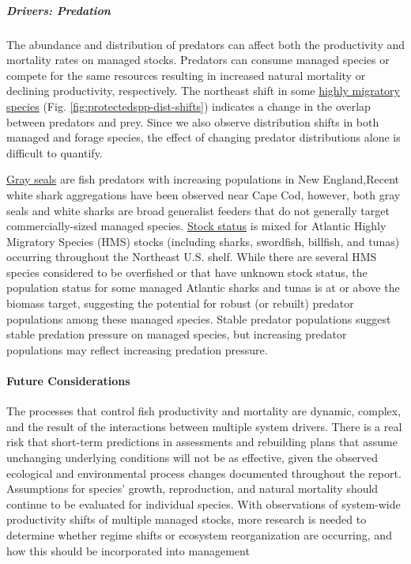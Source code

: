 \documentclass[
  10pt,
]{article}
\begin{document}
\subparagraph{Drivers: Predation}\label{drivers-predation}

The abundance and distribution of predators can affect both the productivity and mortality rates on managed stocks. Predators can consume managed species or compete for the same resources resulting in increased natural mortality or declining productivity, respectively. The northeast shift in some \href{https://noaa-edab.github.io/catalog/cetacean_dist.html}{highly migratory species} (Fig. \ref{fig:protectedspp-dist-shifts}) indicates a change in the overlap between predators and prey. Since we also observe distribution shifts in both managed and forage species, the effect of changing predator distributions alone is difficult to quantify.

\href{https://noaa-edab.github.io/catalog/grayseal.html}{Gray seals} are fish predators with increasing populations in New England,Recent white shark aggregations have been observed near Cape Cod, however, both gray seals and white sharks are broad generalist feeders that do not generally target commercially-sized managed species. \href{https://noaa-edab.github.io/catalog/hms_stock_status.html}{Stock status} is mixed for Atlantic Highly Migratory Species (HMS) stocks (including sharks, swordfish, billfish, and tunas) occurring throughout the Northeast U.S. shelf. While there are several HMS species considered to be overfished or that have unknown stock status, the population status for some managed Atlantic sharks and tunas is at or above the biomass target, suggesting the potential for robust (or rebuilt) predator populations among these managed species. Stable predator populations suggest stable predation pressure on managed species, but increasing predator populations may reflect increasing predation pressure.

\paragraph{Future Considerations}\label{future-considerations-2}

The processes that control fish productivity and mortality are dynamic, complex, and the result of the interactions between multiple system drivers. There is a real risk that short-term predictions in assessments and rebuilding plans that assume unchanging underlying conditions will not be as effective, given the observed ecological and environmental process changes documented throughout the report. Assumptions for species' growth, reproduction, and natural mortality should continue to be evaluated for individual species. With observations of system-wide productivity shifts of multiple managed stocks, more research is needed to determine whether regime shifts or ecosystem reorganization are occurring, and how this should be incorporated into management
\end{document}
